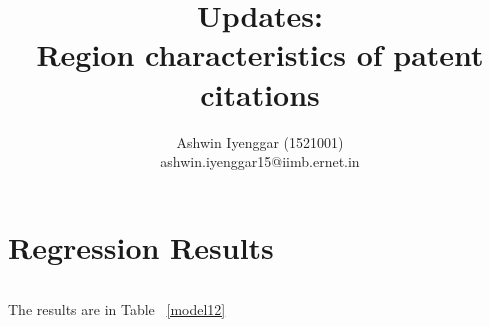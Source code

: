 \documentclass[12pt]{article}
\begin{document}
\title{Updates:\\ Region characteristics of patent citations}
\author{Ashwin Iyenggar  (1521001) \\ ashwin.iyenggar15@iimb.ernet.in} 


\maketitle
\thispagestyle{empty}

\section{Regression Results}
\begin{lstlisting}
\end{lstlisting}
The results are in Table ~\ref{model12}
\begin{landscape}
\begin{centering}

\newpage

\newpage

\newpage

\end{centering}
\end{landscape}
\end{document}
